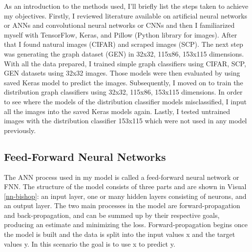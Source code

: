 \documentclass[12pt]{article}
\begin{document}
            As an introduction to the methods used, I’ll briefly list the steps taken to achieve my objectives. 
            Firstly, I reviewed literature available on artificial neural networks or ANNs and convolutional neural networks 
            or CNNs and then I familiarized myself with TensorFlow, Keras, and Pillow (Python library for images). 
            After that I found natural images (CIFAR) and scraped images (SCP). 
            The next step was generating the graph dataset (GEN) in 32x32, 115x86, 153x115 dimensions. 
            With all the data prepared, I trained simple graph classifiers using CIFAR, SCP, GEN datasets using 32x32 images. 
            Those models were then evaluated by using saved Keras model to predict the images. 
            Subsequently, I moved on to train the distribution graph classifiers using 32x32, 115x86, 153x115 dimensions. 
            In order to see where the models of the distribution classifier models misclassified, 
            I input all the images into the saved Keras models again. 
            Lastly, I tested untrained images with the distribution classifier 153x115 which were not used in any model previously.
        
        \subsection{Feed-Forward Neural Networks}

            The ANN process used in my model is called a feed-forward neural network or FNN. 
            The structure of the model consists of three parts and are shown in Visual \ref{nn-bishop}: 
            an input layer, one or many hidden layers consisting of neurons, and an output layer. 
            The two main processes in the model are forward-propagation and back-propagation, 
            and can be summed up by their respective goals, producing an estimate and minimizing the loss. 
            Forward-propagation begins once the model is built and the data is split into the input values x and the target values y. 
            In this scenario the goal is to use x to predict y.  
\end{document}
